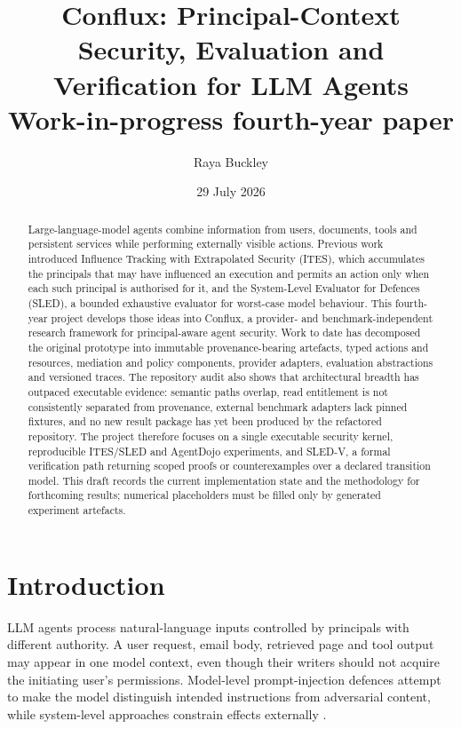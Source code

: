 \documentclass[11pt]{article}
\title{Conflux: Principal-Context Security, Evaluation and Verification for LLM Agents\\\large Work-in-progress fourth-year paper}
\author{Raya Buckley}
\date{29 July 2026}
\begin{document}
\maketitle

\begin{abstract}
Large-language-model agents combine information from users, documents, tools and persistent services while performing externally visible actions. Previous work introduced Influence Tracking with Extrapolated Security (ITES), which accumulates the principals that may have influenced an execution and permits an action only when each such principal is authorised for it, and the System-Level Evaluator for Defences (SLED), a bounded exhaustive evaluator for worst-case model behaviour. This fourth-year project develops those ideas into Conflux, a provider- and benchmark-independent research framework for principal-aware agent security. Work to date has decomposed the original prototype into immutable provenance-bearing artefacts, typed actions and resources, mediation and policy components, provider adapters, evaluation abstractions and versioned traces. The repository audit also shows that architectural breadth has outpaced executable evidence: semantic paths overlap, read entitlement is not consistently separated from provenance, external benchmark adapters lack pinned fixtures, and no new result package has yet been produced by the refactored repository. The project therefore focuses on a single executable security kernel, reproducible ITES/SLED and AgentDojo experiments, and SLED-V, a formal verification path returning scoped proofs or counterexamples over a declared transition model. This draft records the current implementation state and the methodology for forthcoming results; numerical placeholders must be filled only by generated experiment artefacts.
\end{abstract}

\section{Introduction}
LLM agents process natural-language inputs controlled by principals with different authority. A user request, email body, retrieved page and tool output may appear in one model context, even though their writers should not acquire the initiating user's permissions. Model-level prompt-injection defences attempt to make the model distinguish intended instructions from adversarial content, while system-level approaches constrain effects externally \citep{camel,struq,spotlighting}.
\end{document}
